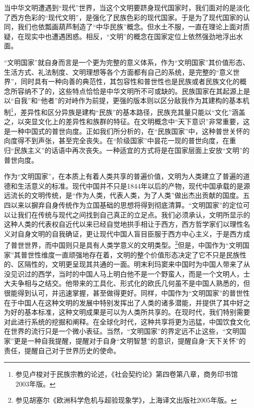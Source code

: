 \documentclass[UTF8, 12pt, a4paper]{ctexrep}
\begin{document}
当中华文明遭遇到“现代”世界，当这个文明要跻身现代国家时，我们面对的是淡化了西方色彩的“现代文明”，是强化了民族色彩的现代国家。于是为了现代国家的认同，我们也依瓢画葫芦制造了“中华民族”概念。但水土不服，一直在理论上面对质疑，在现实中也遭遇困惑。相反，“文明”的概念在国家定位上依然强劲地浮出水面。

“文明国家”就自身而言是一个更为完整的意义体系，作为“文明国家”其价值形态、生活方式、礼法制度、文明理想等各个方面都有自己的系统，是完整的“意义世界”，同时具有一种向善的典范性，其包容性和普世性也是民族或者民族文化的概念所容纳不了的，这些特点恰恰是中华文明所不可或缺的。民族国家在其起源上是以“自我”和“他者”的对峙作为前提，更强的版本则以区分敌我作为其建构的基本机制\footnote{参见卢梭对于民族宗教的论述，《社会契约论》第四卷第八章，商务印书馆2003年版。}，差异性和区分异族是建构“民族”的基本路径，民族充其量只能以“文化”涵盖之，以突显文化上的差异性和族群的特征。在文明概念中“天下意识”非常重要，这是一种中国式的普世向度。正如我们所分析的，在“民族国家”中，这种普世关怀的向度得不到声张，甚至完全丧失。在“阶级国家”中昙花一现的普世向度，在重归“民族主义”的话语中再次丧失。一种适宜的方式将是在国家层面上安放“文明”的普世向度。

作为“文明国家”，在本质上有着人类共享的普遍价值，文明为人类建立了普遍的道德和生活意义的标准。现代中国并不只是1844年以后的产物，现代中国承载的是源远流长的文明传统，是“作为人类，代表人类，为了人类”做出杰出贡献的国度。五四以来以摒弃自身传统作为立国基础的思想将得到彻底清算。“文明国家”的定位可以让我们在传统与现代之间找到自己真正的立足点。我们必须承认，文明所显示的这种人类的代表权自近代以来已经自觉地拱手相让于西方，西方哲学家们以理性名义对自身文明的自我确证，更让现代中国人盲目臣服于西方中心主义，于是西方成了普世世界，而中国则只是具有人类学意义的文明类型。\footnote{参见胡塞尔《欧洲科学危机与超验现象学》，上海译文出版社2005年版。}但是，中国作为“文明国家”其普世性维度一直顽强地存在着，文明的整个价值形态决定了它不只是民族性的、区隔性的，文明更呈现其共通的一面。明末利玛窦来中国时为中国人带来了从没见识过的西学，当时的中国人马上明白他不是一个野蛮人，而是一个文明人，士大夫争相与之结交。他带来的工具化、形式化的欧氏几何虽不是中国人熟悉的，但很能得到认可，并迅速掌握，甚至做得更好。同样，中国作为“文明国家”的普世性在于中国人在这种文明的发展中特别发挥出了人类的诸多潜能，并提供了其中好之为好的基本标准，这种文明成果是可以为人类所共享的。在现时代，我们特别需要对此进行系统的挖掘和阐释。在全球化时代，这种共享将更为迅猛，中国饮食文化在世界的流行只是一个微小表征。当然，“文明国家”的界定远不止这些，“文明国家”更是一种自我提醒，提醒对于自身“文明智慧”的意识，提醒自身“天下关怀”的责任，提醒自己对于世界历史的使命。
\end{document}
